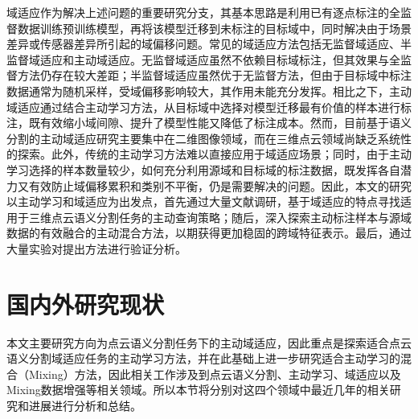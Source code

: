     域适应作为解决上述问题的重要研究分支，其基本思路是利用已有逐点标注的全监督数据训练预训练模型，再将该模型迁移到未标注的目标域中，同时解决由于场景差异或传感器差异所引起的域偏移问题。常见的域适应方法包括无监督域适应、半监督域适应和主动域适应。无监督域适应虽然不依赖目标域标注，但其效果与全监督方法仍存在较大差距；半监督域适应虽然优于无监督方法，但由于目标域中标注数据通常为随机采样，受域偏移影响较大，其作用未能充分发挥。相比之下，主动域适应通过结合主动学习方法，从目标域中选择对模型迁移最有价值的样本进行标注，既有效缩小域间隙、提升了模型性能又降低了标注成本。然而，目前基于语义分割的主动域适应研究主要集中在二维图像领域，而在三维点云领域尚缺乏系统性的探索。此外，传统的主动学习方法难以直接应用于域适应场景；同时，由于主动学习选择的样本数量较少，如何充分利用源域和目标域的标注数据，既发挥各自潜力又有效防止域偏移累积和类别不平衡，仍是需要解决的问题。因此，本文的研究以主动学习和域适应为出发点，首先通过大量文献调研，基于域适应的特点寻找适用于三维点云语义分割任务的主动查询策略；随后，深入探索主动标注样本与源域数据的有效融合的主动混合方法，以期获得更加稳固的跨域特征表示。最后，通过大量实验对提出方法进行验证分析。

\section{国内外研究现状}
本文主要研究方向为点云语义分割任务下的主动域适应，因此重点是探索适合点云语义分割域适应任务的主动学习方法，并在此基础上进一步研究适合主动学习的混合（Mixing）方法，因此相关工作涉及到点云语义分割、主动学习、域适应以及Mixing数据增强等相关领域。所以本节将分别对这四个领域中最近几年的相关研究和进展进行分析和总结。
